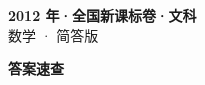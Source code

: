 \documentclass[zihao=-4, a4paper]{ctexart}
\begin{document}
\begin{center}
  {\Large\bfseries 2012 年·全国新课标卷·文科}\\[4pt]
  {\large 数学 · 简答版}
\end{center}
\medskip
{}

\clearpage
{}
\begin{center}{\Large\bfseries 答案速查}\end{center}
\medskip

\end{document}
